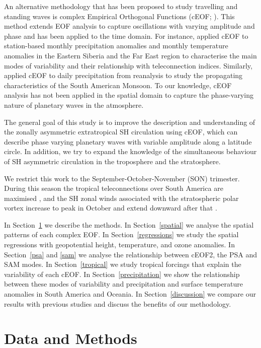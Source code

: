 \documentclass[pdflatex,lineno,sn-basic]{sn-jnl}
\theoremstyle{thmstyleone}%
\theoremstyle{thmstyletwo}%
\theoremstyle{thmstylethree}%
\begin{document}
An alternative methodology that has been proposed to study travelling and standing waves is complex Empirical Orthogonal Functions (cEOF; \citet{horel1984}).
This method extends EOF analysis to capture oscillations with varying amplitude and phase and has been applied to the time domain.
For instance, \citet{krokhin2007} applied cEOF to station-based monthly precipitation anomalies and monthly temperature anomalies in the Eastern Siberia and the Far East region to characterise the main modes of variability and their relationship with teleconnection indices.
Similarly, \citet{gelbrecht2018} applied cEOF to daily precipitation from reanalysis to study the propagating characteristics of the South American Monsoon.
To our knowledge, cEOF analysis has not been applied in the spatial domain to capture the phase-varying nature of planetary waves in the atmosphere.

The general goal of this study is to improve the description and understanding of the zonally asymmetric extratropical SH circulation using cEOF, which can describe phase varying planetary waves with variable amplitude along a latitude circle.
In addition, we try to expand the knowledge of the simultaneous behaviour of SH asymmetric circulation in the troposphere and the stratosphere.

We restrict this work to the September-October-November (SON) trimester. During this season the tropical teleconnections over South America are maximised \citep{cazes-boezio2003}, and the SH zonal winds associated with the stratospheric polar vortex increase to peak in October and extend downward after that \citep{lim2018}.

In Section~\ref{methods} we describe the methods.
In Section~\ref{spatial} we analyse the spatial patterns of each complex EOF.
In Section~\ref{regressions} we study the spatial regressions with geopotential height, temperature, and ozone anomalies.
In Section~\ref{psa} and \ref{sam} we analyse the relationship between cEOF2, the PSA and SAM modes.
In Section~\ref{tropical} we study tropical forcings that explain the variability of each cEOF.
In Section~\ref{precipitation} we show the relationship between these modes of variability and precipitation and surface temperature anomalies in South America and Oceania.
In Section~\ref{discussion} we compare our results with previous studies and discuss the benefits of our methodology.

\hypertarget{methods}{%
\section{Data and Methods}\label{methods}}
\end{document}
